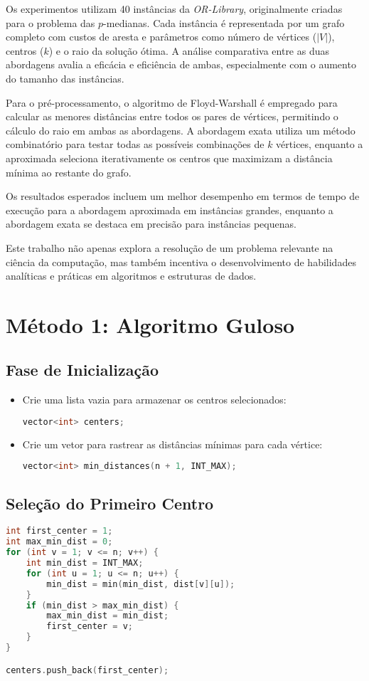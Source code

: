 \documentclass[10pt,conference]{IEEEtran}
\begin{document}
Os experimentos utilizam 40 instâncias da \textit{OR-Library}, originalmente criadas para o problema das \(p\)-medianas. Cada instância é representada por um grafo completo com custos de aresta e parâmetros como número de vértices (\(|V|\)), centros (\(k\)) e o raio da solução ótima. A análise comparativa entre as duas abordagens avalia a eficácia e eficiência de ambas, especialmente com o aumento do tamanho das instâncias.

Para o pré-processamento, o algoritmo de Floyd-Warshall é empregado para calcular as menores distâncias entre todos os pares de vértices, permitindo o cálculo do raio em ambas as abordagens. A abordagem exata utiliza um método combinatório para testar todas as possíveis combinações de \(k\) vértices, enquanto a aproximada seleciona iterativamente os centros que maximizam a distância mínima ao restante do grafo. 

Os resultados esperados incluem um melhor desempenho em termos de tempo de execução para a abordagem aproximada em instâncias grandes, enquanto a abordagem exata se destaca em precisão para instâncias pequenas.

Este trabalho não apenas explora a resolução de um problema relevante na ciência da computação, mas também incentiva o desenvolvimento de habilidades analíticas e práticas em algoritmos e estruturas de dados.

\section{Método 1: Algoritmo Guloso}

\subsection*{Fase de Inicialização}
\begin{itemize}
    \item Crie uma lista vazia para armazenar os centros selecionados:
    \begin{lstlisting}[language=C++]
vector<int> centers;
    \end{lstlisting}
    \item Crie um vetor para rastrear as distâncias mínimas para cada vértice:
    \begin{lstlisting}[language=C++]
vector<int> min_distances(n + 1, INT_MAX);
    \end{lstlisting}
\end{itemize}

\subsection*{Seleção do Primeiro Centro}
\begin{lstlisting}[language=C++]
int first_center = 1;
int max_min_dist = 0;
for (int v = 1; v <= n; v++) {
    int min_dist = INT_MAX;
    for (int u = 1; u <= n; u++) {
        min_dist = min(min_dist, dist[v][u]);
    }
    if (min_dist > max_min_dist) {
        max_min_dist = min_dist;
        first_center = v;
    }
}

centers.push_back(first_center);
    \end{lstlisting}
\end{document}
